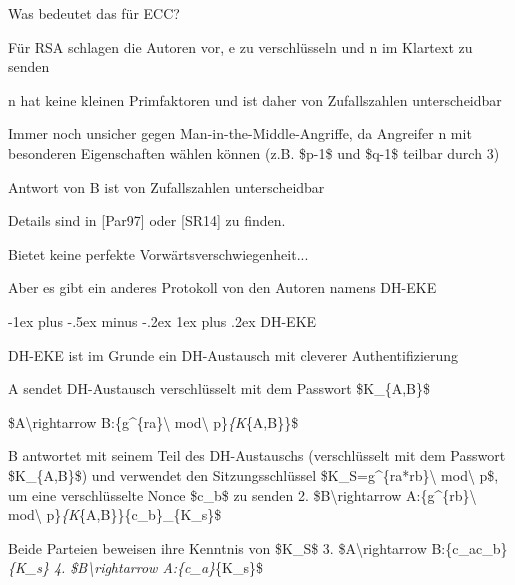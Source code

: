 \documentclass[a4paper]{article}
\makeatletter
\renewcommand{\subsubsection}{\@startsection{subsubsection}{3}{0mm}%
 {-1ex plus -.5ex minus -.2ex}%
 {1ex plus .2ex}%
 {\normalfont\small\bfseries}}
\makeatother
\begin{document}
\begin{multicols}{3}
\begin{itemize*}
            \begin{itemize*}
                  \item Was bedeutet das für ECC?
                  \item Für RSA schlagen die Autoren vor, e zu verschlüsseln und n im Klartext zu senden
                  \begin{itemize*} \item n hat keine kleinen Primfaktoren und ist daher von Zufallszahlen unterscheidbar \item Immer noch unsicher gegen Man-in-the-Middle-Angriffe, da Angreifer n mit besonderen Eigenschaften wählen können (z.B. \$p-1\$ und \$q-1\$ teilbar durch 3) \item Antwort von B ist von Zufallszahlen unterscheidbar \item Details sind in {[}Par97{]} oder {[}SR14{]} zu finden. \end{itemize*}
            \end{itemize*}
            \item
            Bietet keine perfekte Vorwärtsverschwiegenheit...
            \item
            Aber es gibt ein anderes Protokoll von den Autoren namens DH-EKE
      \end{itemize*}


      \subsubsection{DH-EKE}

      \begin{itemize*}
            \item
            DH-EKE ist im Grunde ein DH-Austausch mit cleverer Authentifizierung
            \item
            A sendet DH-Austausch verschlüsselt mit dem Passwort \$K\_\{A,B\}\$

            \begin{enumerate*}
                  \def\labelenumi{\arabic{enumi}.}
                  \item \$A\textbackslash rightarrow B:\{g\^{}\{ra\}\textbackslash{} mod\textbackslash{} p\}\emph{\{K}\{A,B\}\}\$
            \end{enumerate*}
            \item
            B antwortet mit seinem Teil des DH-Austauschs (verschlüsselt mit dem
            Passwort \$K\_\{A,B\}\$) und verwendet den Sitzungsschlüssel
            \$K\_S=g\^{}\{ra*rb\}\textbackslash{} mod\textbackslash{} p\$, um eine
            verschlüsselte Nonce \$c\_b\$ zu senden 2.
            \$B\textbackslash rightarrow A:\{g\^{}\{rb\}\textbackslash{}
            mod\textbackslash{} p\}\emph{\{K}\{A,B\}\}\{c\_b\}\_\{K\_s\}\$
            \item
            Beide Parteien beweisen ihre Kenntnis von \$K\_S\$ 3.
            \$A\textbackslash rightarrow
            B:\{c\_a\textbar\textbar c\_b\}\emph{\{K\_s\} 4.
                  \$B\textbackslash rightarrow A:\{c\_a\}}\{K\_s\}\$
      \end{itemize*}



\end{multicols}
\end{document}
